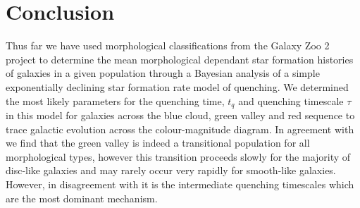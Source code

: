 \documentclass{mn2e}
\begin{document}

\section{Conclusion}\label{conc}
Thus far we have used morphological classifications from the Galaxy Zoo 2 project to determine the mean morphological dependant star formation histories of galaxies in a given population through a Bayesian analysis of a simple exponentially declining star formation rate model of quenching. We determined the most likely parameters for the quenching time, $t_q$ and quenching timescale $\tau$ in this model for galaxies across the blue cloud, green valley and red sequence to trace galactic evolution across the colour-magnitude diagram. In agreement with \citet{Sch2014} we find that the green valley is indeed a transitional population for all morphological types, however this transition proceeds slowly for the majority of disc-like galaxies and may rarely occur very rapidly for smooth-like galaxies. However, in disagreement with \citet{Sch2014} it is the intermediate quenching timescales which are the most dominant mechanism. 
\end{document}
